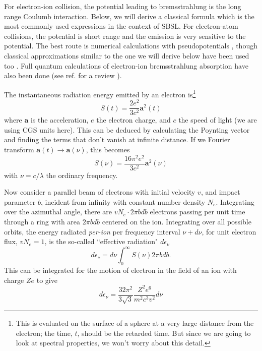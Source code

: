 \documentclass[11pt,prb,aps,nofootinbib,superscriptaddress,floatfix]{revtex4-2}
\begin{document}
For electron-ion collision, the potential leading to bremsstrahlung is the long range Coulumb interaction. Below, we will derive a classical formula which is the most commonly used expressions in the context of SBSL. For electron-atom collisions, the potential is short range and the emission is very sensitive to the potential. The best route is numerical calculations with pseudopotentials \cite{geltman1973free}, though classical approximations similar to the one we will derive below have been used too \cite{hilgenfeldt1999simple,hilgenfeldt1999sonoluminescence,zel2002physics}. Full quantum calculations of electron-ion bremsstrahlung absorption have also been done (see ref. for a review \cite{eckert2015aether}).

The instantaneous radiation energy emitted by an electron is\footnote{This is evaluated on the surface of a sphere at a very large distance from the electron; the time, $t$, should be the retarded time. But since we are going to look at spectral properties, we won't worry about this detail.} \cite{zel2002physics,griffiths2005introduction}
\begin{equation}
    S(t)=\frac{2e^2}{3c^2}\bm{a}^2(t)
\end{equation}
where $\bm{a}$ is the acceleration, $e$ the electron charge, and $c$ the speed of light (we are using CGS units here). This can be deduced by calculating the Poynting vector and finding the terms that don't vanish at infinite distance. If we Fourier transform $\bm{a}(t) \rightarrow \bm{a}(\nu)$, this becomes
\begin{equation}
    S(\nu)=\frac{16 \pi^2 e^2}{3c^2}\bm{a}^2(\nu)
\end{equation}
with $\nu=c/\lambda$ the ordinary frequency.

Now consider a parallel beam of electrons with initial velocity $v$, and impact parameter $b$, incident from infinity with constant number density $N_e$. Integrating over the azimuthal angle, there are $v N_e \cdot  2\pi b db$ electrons passing per unit time through a ring with area $2\pi b db$ centered on the ion. Integrating over all possible orbits, the energy radiated \emph{per-ion} per frequency interval $\nu+d\nu$, for unit electron flux, $v N_e=1$, is the so-called ``effective radiation" $d\epsilon_\nu$ \cite{zel2002physics} 
\begin{equation}
    d\epsilon_\nu = d\nu \int_0^\infty S(\nu) 2 \pi b db.
    \label{eq:effective_radiation}
\end{equation}
This can be integrated for the motion of electron in the field of an ion with charge $Ze$ to give \cite{zel2002physics,landau2013classical}
\begin{equation}
    d\epsilon_\nu = \frac{32 \pi^2 }{3 \sqrt{3}} \frac{Z^2e^6}{m^2 c^3 v^2} d\nu
    \label{eq:effective_radiation_2}
\end{equation}
\end{document}
